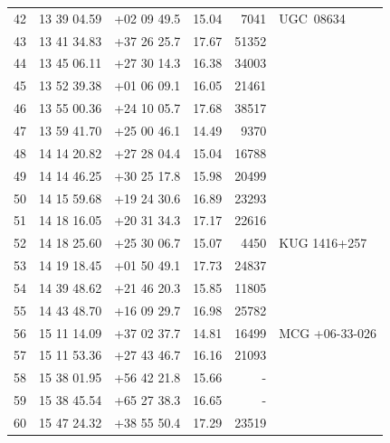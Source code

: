 \documentclass[useAMS,usenatbib]{mn2e}
\begin{document}
\begin{table}
\begin{tabular}{rrrlrl}
  42 &  13 39 04.59 & +02 09 49.5 &  15.04 &   7041 &        UGC~08634 \\
  43 &  13 41 34.83 & +37 26 25.7 &  17.67 &  51352 &                  \\
  44 &  13 45 06.11 & +27 30 14.3 &  16.38 &  34003 &                  \\
  45 &  13 52 39.38 & +01 06 09.1 &  16.05 &  21461 &                  \\
  46 &  13 55 00.36 & +24 10 05.7 &  17.68 &  38517 &                  \\
  47 &  13 59 41.70 & +25 00 46.1 &  14.49 &   9370 &                  \\
  48 &  14 14 20.82 & +27 28 04.4 &  15.04 &  16788 &                  \\
  49 &  14 14 46.25 & +30 25 17.8 &  15.98 &  20499 &                  \\
  50 &  14 15 59.68 & +19 24 30.6 &  16.89 &  23293 &                  \\
  51 &  14 18 16.05 & +20 31 34.3 &  17.17 &  22616 &                  \\
  52 &  14 18 25.60 & +25 30 06.7 &  15.07 &   4450 &     KUG 1416+257 \\
  53 &  14 19 18.45 & +01 50 49.1 &  17.73 &  24837 &                  \\
  54 &  14 39 48.62 & +21 46 20.3 &  15.85 &  11805 &                  \\
  55 &  14 43 48.70 & +16 09 29.7 &  16.98 &  25782 &                  \\
  56 &  15 11 14.09 & +37 02 37.7 &  14.81 &  16499 &   MCG +06-33-026 \\
  57 &  15 11 53.36 & +27 43 46.7 &  16.16 &  21093 &                  \\
  58 &  15 38 01.95 & +56 42 21.8 &  15.66 &      - &                  \\
  59 &  15 38 45.54 & +65 27 38.3 &  16.65 &      - &                  \\
  60 &  15 47 24.32 & +38 55 50.4 &  17.29 &  23519 &                  \\
 \hline
\end{tabular}
\end{table}
\end{document}

